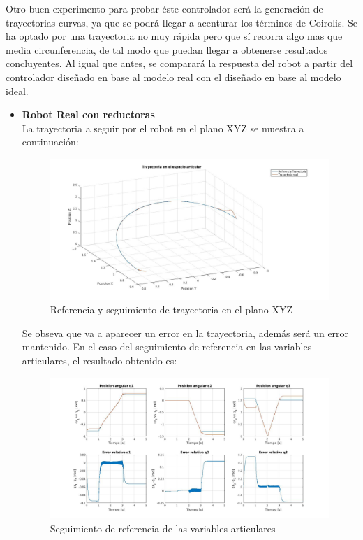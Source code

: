 Otro buen experimento para probar éste controlador será la generación de trayectorias curvas, ya que se podrá llegar a acenturar los términos de Coirolis. Se ha optado por una trayectoria no muy rápida pero que sí recorra algo mas que media circunferencia, de tal modo que puedan llegar a obtenerse resultados concluyentes. Al igual que antes, se comparará la respuesta del robot a partir del controlador diseñado en base al modelo real con el diseñado en base al modelo ideal. \\
\begin{itemize}
	\item \textbf{Robot Real con reductoras} \\
La trayectoria a seguir por el robot en el plano XYZ se muestra a continuación:

\begin{figure}[h!]
	\centering
	\includegraphics[width=.8\textwidth]{exp3_trayPDreal_circular}
	\caption{Referencia y seguimiento de trayectoria en el plano XYZ}
\end{figure}

Se obseva que va a aparecer un error en la trayectoria, además será un error mantenido. En el caso del seguimiento de referencia en las variables articulares, el resultado obtenido es:

\begin{figure}[h!]
	\centering
	\includegraphics[width=.8\textwidth]{exp3_posPDrealCR_circular}
	\caption{Seguimiento de referencia de las variables articulares}
\end{figure}


\end{itemize}
